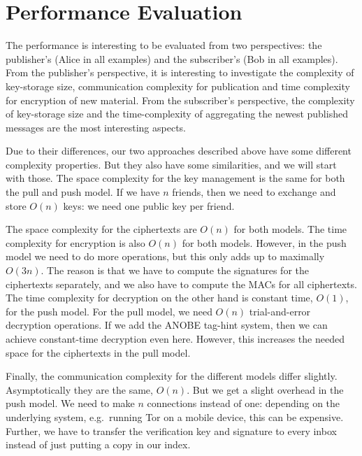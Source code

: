 \section{Performance Evaluation}\label{sec:PerformanceEvaluation}

The performance is interesting to be evaluated from two perspectives: the 
publisher's (Alice in all examples) and the subscriber's (Bob in all examples).
From the publisher's perspective, it is interesting to investigate the 
complexity of key-storage size, communication complexity for publication and 
time complexity for encryption of new material.
From the subscriber's perspective, the complexity of key-storage size and the 
time-complexity of aggregating the newest published messages are the most 
interesting aspects.

Due to their differences, our two approaches described above have some different 
complexity properties.
But they also have some similarities, and we will start with those.
The space complexity for the key management is the same for both the pull and 
push model.
If we have \(n\) friends, then we need to exchange and store \(O(n)\) keys:
we need one public key per friend.

The space complexity for the ciphertexts are \(O(n)\) for both models.
The time complexity for encryption is also \(O(n)\) for both models.
However, in the push model we need to do more operations, but this only adds up 
to maximally \(O(3n)\).
The reason is that we have to compute the signatures for the ciphertexts 
separately, and we also have to compute the \acp{MAC} for all ciphertexts.
The time complexity for decryption on the other hand is constant time, 
\(O(1)\), for the push model.
For the pull model, we need \(O(n)\) trial-and-error decryption operations.
If we add the \ac{ANOBE} tag-hint system, then we can achieve constant-time 
decryption even here.
However, this increases the needed space for the ciphertexts in the pull model.

Finally, the communication complexity for the different models differ slightly.
Asymptotically they are the same, \(O(n)\).
But we get a slight overhead in the push model.
We need to make \(n\) connections instead of one: depending on the underlying 
system, e.g.\ running Tor on a mobile device, this can be expensive.
Further, we have to transfer the verification key and signature to every inbox 
instead of just putting a copy in our index.


